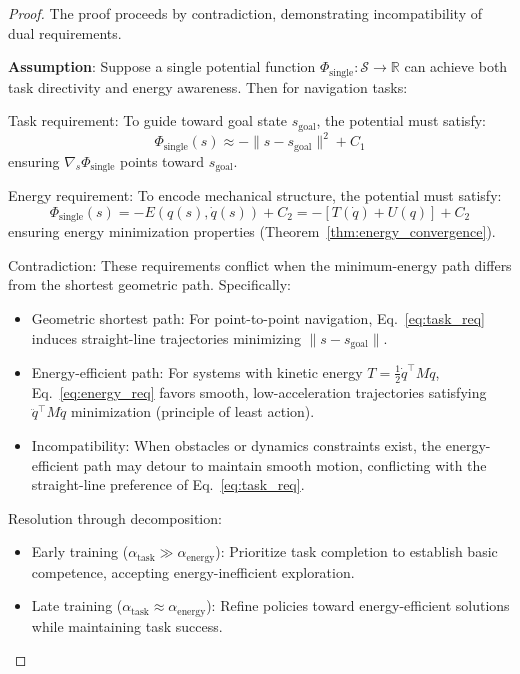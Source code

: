 \documentclass[journal]{IEEEtran}
\begin{document}
	\begin{proof}
		The proof proceeds by contradiction, demonstrating incompatibility of dual requirements.
		
		\textbf{Assumption}: Suppose a single potential function $\Phi_{\text{single}}:\mathcal{S}\to\mathbb{R}$ can achieve both task directivity and energy awareness. Then for navigation tasks:
		
		Task requirement: To guide toward goal state $s_{\text{goal}}$, the potential must satisfy:
		\begin{equation}
			\Phi_{\text{single}}(s) \approx -\|s - s_{\text{goal}}\|^2 + C_1
			\label{eq:task_req}
		\end{equation}
		ensuring $\nabla_s \Phi_{\text{single}}$ points toward $s_{\text{goal}}$.
		
		Energy requirement: To encode mechanical structure, the potential must satisfy:
		\begin{equation}
			\Phi_{\text{single}}(s) = -E(q(s),\dot{q}(s)) + C_2 = -\left[T(\dot{q}) + U(q)\right] + C_2
			\label{eq:energy_req}
		\end{equation}
		ensuring energy minimization properties (Theorem~\ref{thm:energy_convergence}).
		
		Contradiction: These requirements conflict when the minimum-energy path differs from the shortest geometric path. Specifically:
		
		\begin{itemize}
			\item Geometric shortest path: For point-to-point navigation, Eq.~\eqref{eq:task_req} induces straight-line trajectories minimizing $\|s-s_{\text{goal}}\|$.
			
			\item Energy-efficient path: For systems with kinetic energy $T=\frac{1}{2}\dot{q}^\top M\dot{q}$, Eq.~\eqref{eq:energy_req} favors smooth, low-acceleration trajectories satisfying $\ddot{q}^\top M\ddot{q}$ minimization (principle of least action).
			
			\item Incompatibility: When obstacles or dynamics constraints exist, the energy-efficient path may detour to maintain smooth motion, conflicting with the straight-line preference of Eq.~\eqref{eq:task_req}.
		\end{itemize}
		
		Resolution through decomposition: 
		\begin{itemize}
			\item Early training ($\alpha_{\text{task}} \gg \alpha_{\text{energy}}$): Prioritize task completion to establish basic competence, accepting energy-inefficient exploration.
			\item Late training ($\alpha_{\text{task}} \approx \alpha_{\text{energy}}$): Refine policies toward energy-efficient solutions while maintaining task success.
		\end{itemize}
		

\end{proof}
\end{document}
